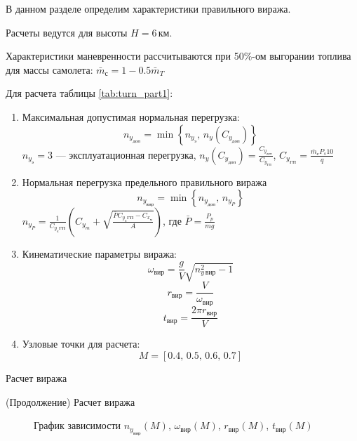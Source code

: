 В данном разделе определим характеристики правильного виража.

Расчеты ведутся для высоты $H=6\, \text{км}$.

Характеристики маневренности рассчитываются при 50\%-ом выгорании
топлива для массы самолета: $\bar{m}_с = 1 - 0.5 \bar{m}_T$

Для расчета таблицы \ref{tab:turn_part1}: 
\begin{enumerate}
    \item Максимальная допустимая нормальная перегрузка:
        \[
            n_{y_{доп}}=\min \left\{ n_{y_{э}},\,n_y(C_{y_{доп}}) \right\} 
        \]
        $n_{y_{э}} = 3$ --- эксплуатационная перегрузка, $n_y(C_{y_{доп}}) = \frac{C_{y_{доп}}}{C_{y_{ГП}}}$,
        $C_{y_{ГП}} = \frac{\bar{m}_с P_s 10}{q}$
    \item Нормальная перегрузка предельного правильного виража
        \[
            n_{y_{вир}}=\min \left\{ n_{y_{доп}},\,n_{y_P} \right\} 
        \]
        $n_{y_{P}} = \frac{1}{C_{y_{a}ГП}} \left( C_{y_m} + \sqrt{
        \frac{\bar{P} C_{y_{a}ГП} - C_{x_{м}} }{A}} \right) $, где $\bar{P} = \frac{P_p}{mg}$
    \item Кинематические параметры виража:
        \[
            \omega_{вир}  = \frac{g}{V} \sqrt{n_{y\, вир}^2 - 1}
        \]
        \[
            r_{вир} = \frac{V}{\omega_{вир}}
        \]
        \[
            t_{вир} = \frac{2 \pi r_{вир}}{V}
        \]
        \item Узловые точки для расчета:
        \[
            M = [0.4,\, 0.5,\, 0.6,\,0.7]
        \]

\end{enumerate}

\begin{table}[H]
    \centering
    \caption{Расчет виража}
    \label{tab:turn_part1}
    
\end{table}

\addtocounter{table}{-1}
\addtocounter{totaltables}{-1}
\begin{table}[H]
    \centering
    \caption{(Продолжение) Расчет виража}
    \label{tab:turn_part2}
    
\end{table}
 
\begin{figure}[H]
\centering
\resizebox{.79\linewidth}{!}{}
\caption{График зависимости $n_{y_{вир}}(M)$, $\omega_{вир}(M)$, $r_{вир}(M)$, $t_{вир}(M)$}
\label{fig:turn}
\end{figure}

